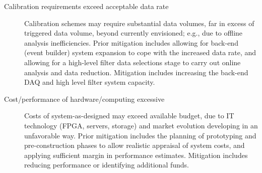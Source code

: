 \begin{description}
\item[Calibration requirements exceed acceptable data rate]
  Calibration schemes may require substantial data 
volumes, far in excess of triggered data volume, beyond currently
envisioned; e.g., due to offline analysis inefficiencies. Prior
mitigation includes allowing for back-end (event builder) system expansion to cope
with the increased data rate, and allowing for a high-level filter data
selections stage to carry out online analysis and data
reduction. Mitigation includes increasing the back-end DAQ and high
level filter system capacity. 

\item[Cost/performance of hardware/computing excessive] Costs of
  system-as-designed may exceed available budget, due to IT technology (FPGA, servers, storage) and market evolution developing in an unfavorable way. Prior mitigation
  includes the planning of prototyping and pre-construction phases to allow
  realistic appraisal of system costs, and applying sufficient margin
  in performance estimates.  Mitigation includes reducing performance
  or identifying additional funds. 





\end{description}
